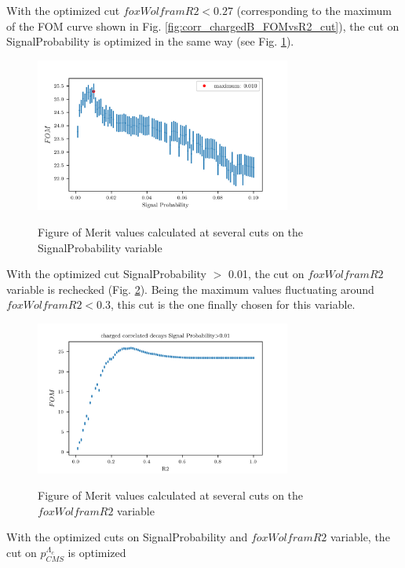 With the optimized cut $foxWolframR2 < 0.27$ (corresponding to the maximum of the FOM curve shown in Fig. \ref{fig:corr_chargedB_FOMvsR2_cut}), the cut on SignalProbability is optimized in the same way (see Fig. \ref{fig:corr_chargedB_FOMvsSigProb_cut}).


\begin{figure}[H]
{\includegraphics[width=0.75\textwidth]{03-Selection/figs/corr_chargedB_FOMvsSigProb_cut.png}}
\caption{Figure of Merit values calculated at several cuts on the SignalProbability variable}
\label{fig:corr_chargedB_FOMvsSigProb_cut}
\end{figure}

With the optimized cut SignalProbability $ > $ 0.01, the cut on $foxWolframR2$ variable is rechecked (Fig. \ref{fig:corr_chargedB_FOMvsR2_cut_SigProbOpt}). Being the maximum values fluctuating around $foxWolframR2 < 0.3$, this cut is the one finally chosen for this variable.   

\begin{figure}[H]
{\includegraphics[width=0.75\textwidth]{03-Selection/figs/corr_chargedB_FOMvsR2_cut_SigProbOpt.png}}
\caption{Figure of Merit values calculated at several cuts on the $foxWolframR2$ variable}
\label{fig:corr_chargedB_FOMvsR2_cut_SigProbOpt}
\end{figure}

With the optimized cuts on SignalProbability and $foxWolframR2$ variable, the cut on $p^{\Lambda_c}_{CMS}$ is optimized\\
\vspace{0.2 cm}


